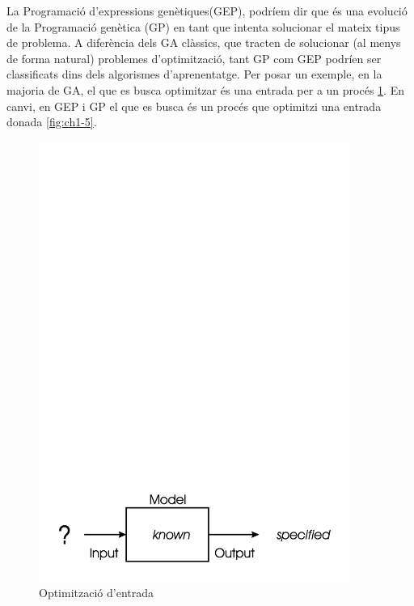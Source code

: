 \documentclass[titlepage,a4paper,12pt]{book}
\begin{document}
La Programació d'expressions genètiques(GEP), podríem dir que és una evolució de
la Programació genètica (GP) en tant que intenta solucionar el mateix tipus de
problema.  A diferència dels GA clàssics, que tracten de solucionar (al menys de
forma natural) problemes d'optimització, tant GP com GEP podríen ser
classificats dins dels algorismes d'aprenentatge.  Per posar un exemple, en la
majoria de GA, el que es busca optimitzar és una entrada per a un procés
\ref{fig:ch1-4}.  En canvi, en GEP i GP el que es busca és un procés que
optimitzi una entrada donada \ref{fig:ch1-5}.

\begin{figure} \centering \includegraphics[width=4in]{intro/1-4.jpg}
\caption{\label{fig:ch1-4}Optimització d'entrada}
\end{figure}
\end{document}
